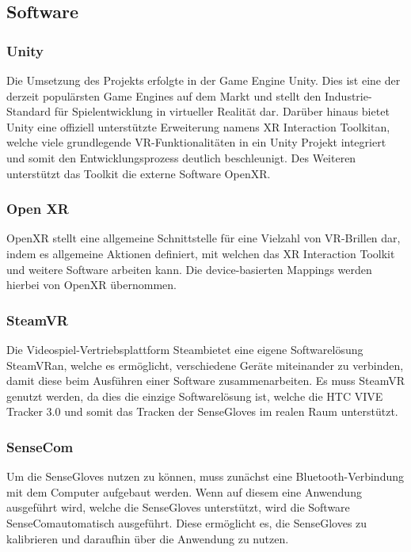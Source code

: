 \subsection{Software}
\subsubsection{Unity}
Die Umsetzung des Projekts erfolgte in der Game Engine \dq Unity\dq. Dies ist eine der derzeit populärsten Game Engines auf dem Markt und stellt den Industrie-Standard für Spielentwicklung in virtueller Realität dar. Darüber hinaus bietet Unity eine offiziell unterstützte Erweiterung namens \dq XR Interaction Toolkit\dq an, welche viele grundlegende VR-Funktionalitäten in ein Unity Projekt integriert und somit den Entwicklungsprozess deutlich beschleunigt. Des Weiteren unterstützt das Toolkit die externe Software \dq OpenXR\dq.

\subsubsection{Open XR}
OpenXR stellt eine allgemeine Schnittstelle für eine Vielzahl von VR-Brillen dar, indem es allgemeine Aktionen definiert, mit welchen das XR Interaction Toolkit und weitere Software arbeiten kann. Die device-basierten Mappings werden hierbei von OpenXR übernommen.

\subsubsection{SteamVR}
Die Videospiel-Vertriebsplattform \dq Steam\dq bietet eine eigene Softwarelösung \dq SteamVR\dq an, welche es ermöglicht, verschiedene Geräte miteinander zu verbinden, damit diese beim Ausführen einer Software zusammenarbeiten. Es muss SteamVR genutzt werden, da dies die einzige Softwarelösung ist, welche die HTC VIVE Tracker 3.0 und somit das Tracken der SenseGloves im realen Raum unterstützt.

\subsubsection{SenseCom}
Um die SenseGloves nutzen zu können, muss zunächst eine Bluetooth-Verbindung mit dem Computer aufgebaut werden. Wenn auf diesem eine Anwendung ausgeführt wird, welche die SenseGloves unterstützt, wird die Software \dq SenseCom\dq automatisch ausgeführt. Diese ermöglicht es, die SenseGloves zu kalibrieren und daraufhin über die Anwendung zu nutzen.

